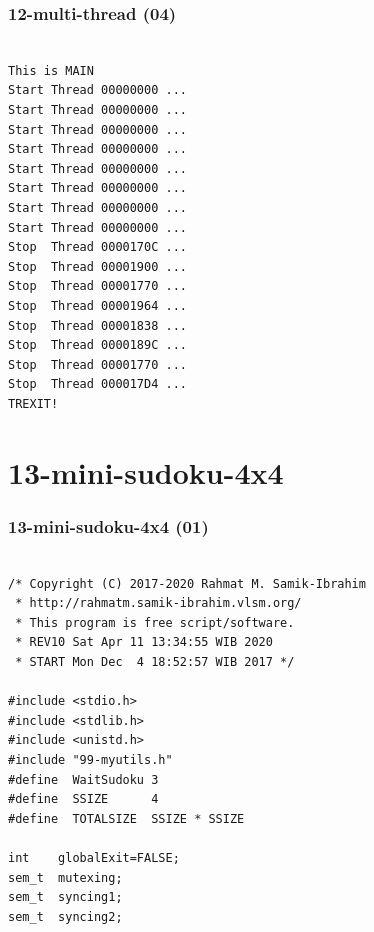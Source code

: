 \documentclass[xcolor=table, notheorems, hyperref={pdfpagelabels=false}]{beamer}
\begin{document}
\begin{frame}[fragile]
\frametitle{12-multi-thread (04)}
\begin{lstlisting}[basicstyle=\ttfamily\small]        %  65
% \begin{lstlisting}[basicstyle=\ttfamily\large]        %  54

This is MAIN
Start Thread 00000000 ...
Start Thread 00000000 ...
Start Thread 00000000 ...
Start Thread 00000000 ...
Start Thread 00000000 ...
Start Thread 00000000 ...
Start Thread 00000000 ...
Start Thread 00000000 ...
Stop  Thread 0000170C ...
Stop  Thread 00001900 ...
Stop  Thread 00001770 ...
Stop  Thread 00001964 ...
Stop  Thread 00001838 ...
Stop  Thread 0000189C ...
Stop  Thread 00001770 ...
Stop  Thread 000017D4 ...
TREXIT!

\end{lstlisting}
\end{frame}

\section{13-mini-sudoku-4x4}
\begin{frame}[fragile]
\frametitle{13-mini-sudoku-4x4 (01)}
\begin{lstlisting}[basicstyle=\ttfamily\small]        %  65
% \begin{lstlisting}[basicstyle=\ttfamily\large]        %  54

/* Copyright (C) 2017-2020 Rahmat M. Samik-Ibrahim
 * http://rahmatm.samik-ibrahim.vlsm.org/
 * This program is free script/software.
 * REV10 Sat Apr 11 13:34:55 WIB 2020
 * START Mon Dec  4 18:52:57 WIB 2017 */

#include <stdio.h>
#include <stdlib.h>
#include <unistd.h>
#include "99-myutils.h"
#define  WaitSudoku 3
#define  SSIZE      4
#define  TOTALSIZE  SSIZE * SSIZE

int    globalExit=FALSE;
sem_t  mutexing;
sem_t  syncing1;
sem_t  syncing2;

\end{lstlisting}
\end{frame}
\end{document}
